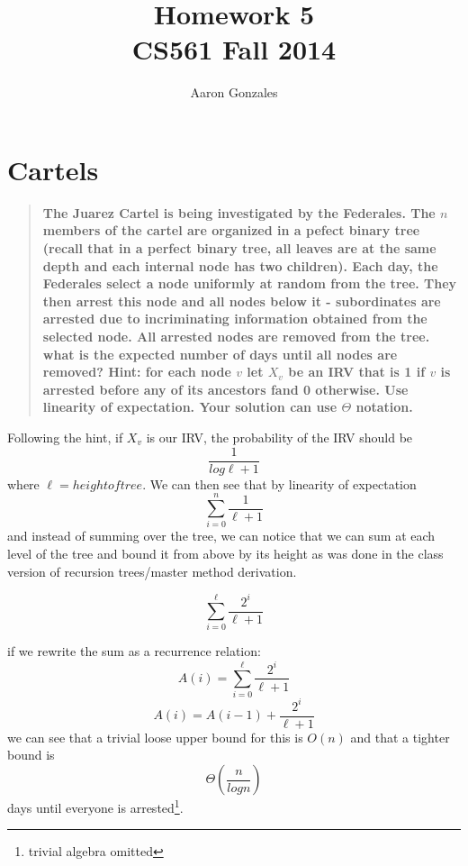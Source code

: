 \documentclass[titlepage]{article}\usepackage[]{graphicx}\usepackage[]{color}
\begin{document}
\title{Homework 5 \\ CS561 Fall 2014}
\author{Aaron Gonzales}
\maketitle


\section{Cartels}
  \begin{quote}
    \textbf{The Juarez Cartel is being investigated by the Federales. The $n$
    members of the cartel are organized in a pefect binary tree (recall that in a
  perfect binary tree, all leaves are at the same depth and each internal node
  has two children). Each day, the Federales select a node uniformly at random
  from the tree. They then arrest this node and all nodes below it - subordinates
  are arrested due to incriminating information obtained from the selected node.
  All arrested nodes are removed from the tree. \\ what is the expected number of
  days until all nodes are removed? Hint: for each node $v$ let $X_v$ be an IRV
  that is 1 if $v$ is arrested before any of its ancestors fand 0 otherwise. Use
  linearity of expectation. Your solution can use $\Theta$ notation. }
  \end{quote}

  Following the hint, if $X_v$ is our IRV, the probability of the IRV should be
  \[ \frac{1}{log \ell +1} \] where $\ell = height of tree$. We can then see that
  by linearity of expectation 
  \[ \sum_{i=0}^n \frac{1}{\ell +1} \] and instead of summing over the tree,
  we can notice that we can sum at each level of the tree and bound it from above
  by its height as was done in the class version of recursion trees/master
  method derivation. 

  \[ \sum_{i=0}^{\ell} \frac{2^i}{\ell +1} \]

  if we rewrite the sum as a recurrence relation:
  \[ A(i) = \sum_{i=0}^{\ell} \frac{2^i}{\ell +1} \]
  \[ A(i) = A(i-1) + \frac{2^i}{\ell +1} \]
  we can see that a trivial loose upper bound for this is $O(n)$ 
  and that a tighter bound is 
  \[ \Theta\left(\frac{n}{log n}\right) \] 
  days until everyone is arrested\footnote{trivial algebra omitted}. 
\end{document}
